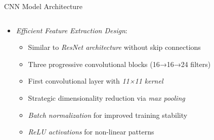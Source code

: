 \documentclass[aspectratio=169,8pt]{beamer}  %
\begin{document}
\begin{frame}{CNN Model Architecture}
\begin{columns}[T]
\begin{column}{0.6\textwidth}
\begin{itemize}
\item \emph{Efficient Feature Extraction Design}:
  \begin{itemize}
  \item Similar to \emph{ResNet architecture} without skip connections
  \item Three progressive convolutional blocks (16→16→24 filters)
  \item First convolutional layer with \emph{11×11 kernel}
  \item Strategic dimensionality reduction via \emph{max pooling}
  \item \emph{Batch normalization} for improved training stability
  \item \emph{ReLU activations} for non-linear patterns
  \end{itemize}
\end{itemize}


\end{column}
\end{columns}
\end{frame}
\end{document}
